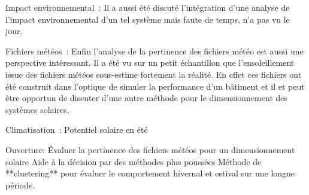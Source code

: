 Impact environnemental~:
Il a aussi été discuté l’intégration d’une analyse de l’impact environnemental
d’un tel système mais faute de temps, n’a pas vu le jour.

Fichiers météos~:
Enfin l’analyse de la pertinence des fichiers météo est aussi une perspective intéressant.
Il a été vu sur un petit échantillon que l’ensoleillement issue des fichiers météos
sous-estime fortement la réalité. En effet ces fichiers ont été construit dans l’optique
de simuler la performance d’un bâtiment et il et peut être opportun de discuter d’une
autre méthode pour le dimensionnement des systèmes solaires.


Climatisation~:
Potentiel solaire en été


Ouverture:
Évaluer la pertinence des fichiers météos pour un dimensionnement solaire
Aide à la décision par des méthodes plus poussées
Méthode de **clustering** pour évaluer le comportement hivernal et estival sur une
longue période.
